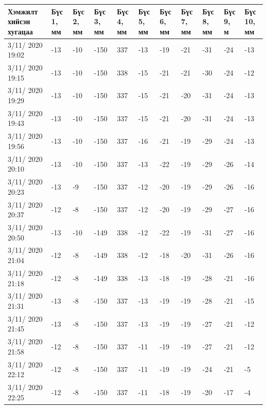 \begin{table}[h]
    \centering
    \begin{tabular}{|p{1.5cm}|p{0.8cm}|p{0.8cm}|p{0.8cm}|p{0.8cm}|p{0.8cm}|p{0.8cm}|p{0.8cm}|p{0.8cm}|p{0.8cm}|p{0.8cm}|}
         \hline
     Хэмжилт хийсэн хугацаа & Бүс 1, мм&	Бүс 2, мм&	Бүс 3, мм&	Бүс 4, мм&	Бүс 5, мм&	Бүс 6, мм&	Бүс 7, мм&	Бүс 8, мм&	Бүс 9, м&	Бүс 10, мм \\ \hline
3/11/ 2020 19:02&-13&-10&	-150&337&-13&-19&-21&-31&-24&	-13 \\ \hline
3/11/ 2020 19:15&-13&-10&	-150&338&-15&-21&-21&-30&-24&	-12 \\ \hline
3/11/ 2020 19:29&-13&-10&	-150&337&-15&-21&-20&-31&-24&	-13 \\ \hline
3/11/ 2020 19:43&-13&-10&	-150&337&-15&-21&-20&-31&-24&	-13 \\ \hline
3/11/ 2020 19:56&-13&-10&	-150&337&-16&-21&-19&-29&-24&	-13 \\ \hline
3/11/ 2020 20:10&-13&-10&	-150&337&-13&-22&-19&-29&-26&	-14 \\ \hline
3/11/ 2020 20:23&-13&-9&	-150&337&-12&-20&-19&-29&-26&	-16 \\ \hline
3/11/ 2020 20:37&-12&-8&	-150&337&-12&-20&-19&-29&-27&	-16 \\ \hline
3/11/ 2020 20:50&-13&-10&	-149&338&-12&-22&-19&-31&-27&	-16 \\ \hline
3/11/ 2020 21:04&-12&-8&	-149&338&-12&-18&-20&-31&-26&	-16 \\ \hline
3/11/ 2020 21:18&-12&-8&	-149&338&-13&-18&-19&-28&-21&	-16 \\ \hline
3/11/ 2020 21:31&-13&-8&	-150&337&-13&-19&-19&-28&-21&	-15 \\ \hline
3/11/ 2020 21:45&-13&-8&	-150&337&-13&-19&-19&-27&-21&	-12 \\ \hline
3/11/ 2020 21:58&-12&-8&	-150&337&-11&-19&-19&-27&-21&	-12 \\ \hline
3/11/ 2020 22:12&-12&-8&	-150&337&-11&-19&-19&-24&-21&	-5 \\ \hline
3/11/ 2020 22:25&-12&-8&	-150&337&-11&-18&-19&-20&-17&	-4 \\ \hline
    \end{tabular}
\end{table}
